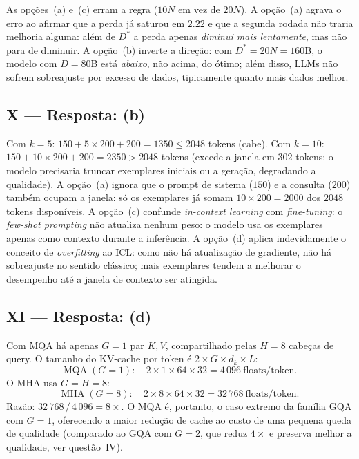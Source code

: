 \documentclass{dlproblemset}
\begin{document}
As opções~(a) e~(c) erram a regra ($10N$ em vez de $20N$).
A opção~(a) agrava o erro ao afirmar que a perda já saturou em $2.22$ e que a segunda
rodada não traria melhoria alguma: além de $D^*$ a perda apenas \emph{diminui mais
lentamente}, mas não para de diminuir.
A opção~(b) inverte a direção: com $D^* = 20N = 160$B, o modelo com
$D = 80$B está \emph{abaixo}, não acima, do ótimo; além disso, LLMs
não sofrem sobreajuste por excesso de dados, tipicamente quanto mais dados melhor.

\subsection*{X — Resposta: (b)}
Com $k = 5$: $150 + 5 \times 200 + 200 = 1350 \le 2048$ tokens (cabe).
Com $k = 10$: $150 + 10 \times 200 + 200 = 2350 > 2048$ tokens (excede a janela em
$302$ tokens; o modelo precisaria truncar exemplares iniciais ou a geração, degradando a qualidade).
A opção~(a) ignora que o prompt de sistema ($150$) e a consulta ($200$) também ocupam a
janela: só os exemplares já somam $10 \times 200 = 2000$ dos $2048$ tokens disponíveis.
A opção~(c) confunde \textit{in-context learning} com \textit{fine-tuning}: o \textit{few-shot
prompting} não atualiza nenhum peso: o modelo usa os exemplares apenas como contexto durante
a inferência.
A opção~(d) aplica indevidamente o conceito de \textit{overfitting} ao ICL: como não há
atualização de gradiente, não há sobreajuste no sentido clássico; mais exemplares tendem a
melhorar o desempenho até a janela de contexto ser atingida.

\subsection*{XI — Resposta: (d)}
Com MQA há apenas $G = 1$ par $K,V$, compartilhado pelas $H = 8$ cabeças de query.
O tamanho do KV-cache por token é $2 \times G \times d_k \times L$:
\[
  \text{MQA}\;(G{=}1):\quad 2 \times 1 \times 64 \times 32 = 4\,096\ \text{floats/token}.
\]
O MHA usa $G = H = 8$:
\[
  \text{MHA}\;(G{=}8):\quad 2 \times 8 \times 64 \times 32 = 32\,768\ \text{floats/token}.
\]
Razão: $32\,768\,/\,4\,096 = 8\times$. O MQA é, portanto, o caso extremo da família
GQA com $G{=}1$, oferecendo a maior redução de cache ao custo de uma pequena queda
de qualidade (comparado ao GQA com $G{=}2$, que reduz $4\times$ e preserva melhor
a qualidade, ver questão~IV).

\end{document}
